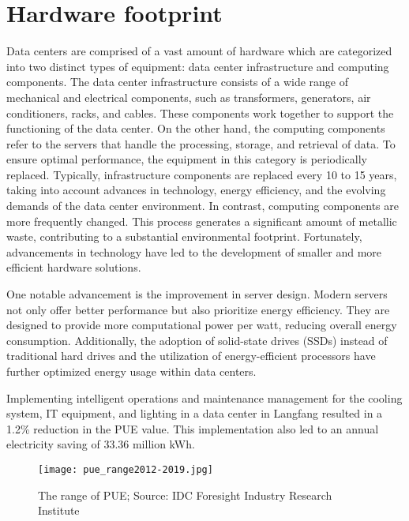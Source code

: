 \documentclass[
  a4paper,  %
  twoside,  %
  bibliography=totoc,
  headsepline,
  cleardoublepage=empty,
  parskip=half,
  draft=false
]{scrbook}
\begin{document}

\chapter{Hardware footprint}
Data centers are comprised of a vast amount of hardware which are categorized into two distinct types of equipment: data center infrastructure and computing components. The data center infrastructure consists of a wide range of mechanical and electrical components, such as transformers, generators, air conditioners, racks, and cables. These components work together to support the functioning of the data center. On the other hand, the computing components refer to the servers that handle the processing, storage, and retrieval of data. To ensure optimal performance, the equipment in this category is periodically replaced. Typically, infrastructure components are replaced every 10 to 15 years, taking into account advances in technology, energy efficiency, and the evolving demands of the data center environment.\cite{samaye2024energy} In
contrast, computing components are more frequently changed. This process generates a significant amount of metallic waste, contributing to a substantial environmental footprint. Fortunately, advancements in technology have led to the development of smaller and more efficient hardware solutions.

One notable advancement is the improvement in server design. Modern servers not only offer better performance but also prioritize energy efficiency. They are designed to provide more computational power per watt, reducing overall energy consumption. Additionally, the adoption of solid-state drives (SSDs) instead of traditional hard drives and the utilization of energy-efficient processors have further optimized energy usage within data centers.

Implementing intelligent operations and maintenance management for the cooling system, IT equipment, and lighting in a data center in Langfang resulted in a 1.2\% reduction in the PUE value. This implementation also led to an annual electricity saving of 33.36 million kWh\cite{li2023china}.

\begin{figure}
	\centering
	\texttt{[image: pue\_range2012-2019.jpg]}
	\caption{The range of PUE; Source: IDC Foresight Industry Research Institute}
\end{figure}
\end{document}
